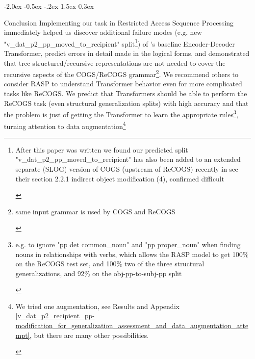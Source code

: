 \documentclass[11pt]{article}
\makeatletter
\renewcommand\section{\@startsection{section}{1}{\z@}%
                                  {-2.0ex \@plus -0.5ex \@minus -.2ex}%
                                  {1.5ex \@plus 0.3ex}%
                                  {\large\bfseries\raggedright}}
\makeatother
\begin{document}
\section{Conclusion} 
Implementing our task in Restricted Access Sequence Processing immediately helped us discover additional failure modes (e.g. new "v\_dat\_p2\_pp\_moved\_to\_recipient" split\footnote{\begin{footnotesize}After this paper was written we found our predicted split "v\_dat\_p2\_pp\_moved\_to\_recipient" has also been added to an extended separate (SLOG) version of COGS (upstream of ReCOGS) recently in \citep{li2023slogstructuralgeneralizationbenchmark} see their section 2.2.1 indirect object modification (4), confirmed difficult\end{footnotesize}}) of \citep{Wu2023}'s baseline Encoder-Decoder Transformer, predict errors in detail made in the logical forms, and demonstrated that tree-structured/recursive representations are not needed to cover the recursive aspects of the COGS/ReCOGS grammar\footnote{\begin{footnotesize}same input grammar is used by COGS and ReCOGS\end{footnotesize}}. We recommend others to consider RASP to understand Transformer behavior even for more complicated tasks like ReCOGS. We predict that Transformers should be able to perform the ReCOGS task (even structural generalization splits) with high accuracy and that the problem is just of getting the Transformer to learn the appropriate rules\footnote{\begin{footnotesize}e.g. to ignore "pp det common\_noun" and "pp proper\_noun" when finding nouns in relationships with verbs, which allows the RASP model to get 100\% on the ReCOGS test set, and 100\% two of the three structural generalizations, and 92\% on the obj-pp-to-subj-pp split\end{footnotesize}}, turning attention to data augmentation\footnote{\begin{footnotesize}We tried one augmentation, see Results and Appendix \ref{v_dat_p2_recipient_pp-modification_for_generalization_assessment_and_data_augmentation_attempt}, but there are many other possibilities.

\end{footnotesize}}
\end{document}
